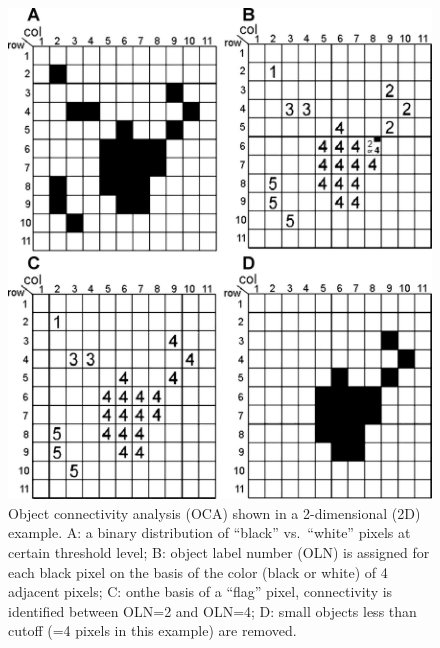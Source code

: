 \begin{figure}[p]
	\centering
	\includegraphics[width=\imsize]{img/Tsuda2008/Tsuda-03}
	\caption{Object connectivity analysis (OCA) shown in a 2-dimensional (2D) example. A: a binary distribution of ``black'' vs.\ ``white'' pixels at certain threshold level; B: object label number (OLN) is assigned for each black pixel on the basis of the color (black or white) of 4 adjacent pixels; C: onthe basis of a ``flag'' pixel, connectivity is identified between OLN=2 and OLN=4; D: small objects
less than cutoff (=4 pixels in this example) are removed.}
	\label{fig:oca}
\end{figure}

